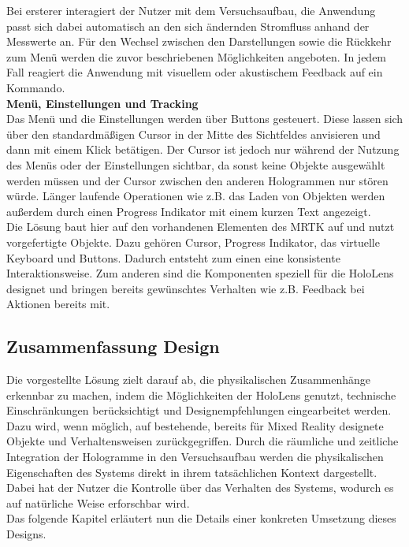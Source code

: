 Bei ersterer interagiert der Nutzer mit dem Versuchsaufbau, die Anwendung passt sich dabei automatisch an den sich ändernden Stromfluss anhand der Messwerte an. Für den Wechsel zwischen den Darstellungen sowie die Rückkehr zum Menü werden die zuvor beschriebenen Möglichkeiten angeboten. In jedem Fall reagiert die Anwendung mit visuellem oder akustischem Feedback auf ein Kommando.\\

\textbf{Menü, Einstellungen und Tracking}\\
Das Menü und die Einstellungen werden über Buttons gesteuert. Diese lassen sich über den standardmäßigen Cursor in der Mitte des Sichtfeldes anvisieren und dann mit einem Klick betätigen. Der Cursor ist jedoch nur während der Nutzung des Menüs oder der Einstellungen sichtbar, da sonst keine Objekte ausgewählt werden müssen und der Cursor zwischen den anderen Hologrammen nur stören würde. Länger laufende Operationen wie z.B. das Laden von Objekten werden außerdem durch einen Progress Indikator mit einem kurzen Text angezeigt.\\

Die Lösung baut hier auf den vorhandenen Elementen des MRTK auf und nutzt vorgefertigte Objekte. Dazu gehören Cursor, Progress Indikator, das virtuelle Keyboard und Buttons. Dadurch entsteht zum einen eine konsistente Interaktionsweise. Zum anderen sind die Komponenten speziell für die HoloLens designet und bringen bereits gewünschtes Verhalten wie z.B. Feedback bei Aktionen bereits mit.

\subsection{Zusammenfassung Design}
\label{sec-4-5}
Die vorgestellte Lösung zielt darauf ab, die physikalischen Zusammenhänge erkennbar zu machen, indem die Möglichkeiten der HoloLens genutzt, technische Einschränkungen berücksichtigt und Designempfehlungen eingearbeitet werden. Dazu wird, wenn möglich, auf bestehende, bereits für Mixed Reality designete Objekte und Verhaltensweisen zurückgegriffen. Durch die räumliche und zeitliche Integration der Hologramme in den Versuchsaufbau werden die physikalischen Eigenschaften des Systems direkt in ihrem tatsächlichen Kontext dargestellt. Dabei hat der Nutzer die Kontrolle über das Verhalten des Systems, wodurch es auf natürliche Weise erforschbar wird.\\

Das folgende Kapitel erläutert nun die Details einer konkreten Umsetzung dieses Designs.

